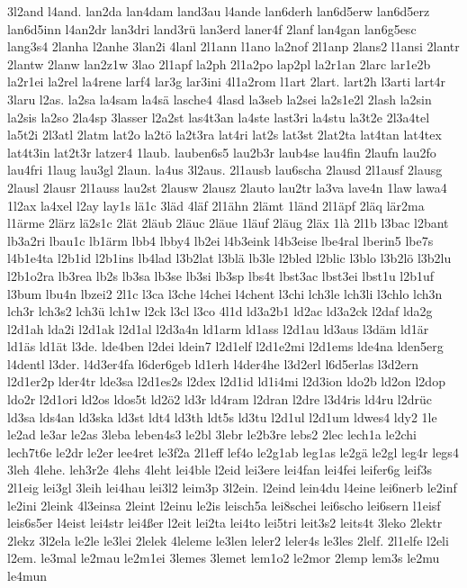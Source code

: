 {3l2and
l4and.
lan2da
lan4dam
land3au
l4ande
lan6derh
lan6d5erw
lan6d5erz
lan6d5inn
l4an2dr
lan3dri
land3rü
lan3erd
laner4f
2lanf
lan4gan
lan6g5esc
lang3s4
2lanha
l2anhe
3lan2i
4lanl
2l1ann
l1ano
la2nof
2l1anp
2lans2
l1ansi
2lantr
2lantw
2lanw
lan2z1w
3lao
2l1apf
la2ph
2l1a2po
lap2pl
la2r1an
2larc
lar1e2b
la2r1ei
la2rel
la4rene
larf4
lar3g
lar3ini
4l1a2rom
l1art
2lart.
lart2h
l3arti
lart4r
3laru
l2as.
la2sa
la4sam
la4sä
lasche4
4lasd
la3seb
la2sei
la2s1e2l
2lash
la2sin
la2sis
la2so
2la4sp
3lasser
l2a2st
las4t3an
la4ste
last3ri
la4stu
la3t2e
2l3a4tel
la5t2i
2l3atl
2latm
lat2o
la2tö
la2t3ra
lat4ri
lat2s
lat3st
2lat2ta
lat4tan
lat4tex
lat4t3in
lat2t3r
latzer4
1laub.
lauben6s5
lau2b3r
laub4se
lau4fin
2laufn
lau2fo
lau4fri
1laug
lau3gl
2laun.
la4us
3l2aus.
2l1ausb
lau6scha
2lausd
2l1ausf
2lausg
2lausl
2lausr
2l1auss
lau2st
2lausw
2lausz
2lauto
lau2tr
la3va
lave4n
1law
lawa4
1l2ax
la4xel
l2ay
lay1s
lä1c
3läd
4läf
2l1ähn
2lämt
1länd
2l1äpf
2läq
lär2ma
l1ärme
2lärz
lä2s1c
2lät
2läub
2läuc
2läue
1läuf
2läug
2läx
1là
2l1b
l3bac
l2bant
lb3a2ri
lbau1c
lb1ärm
lbb4
lbby4
lb2ei
l4b3eink
l4b3eise
lbe4ral
lberin5
lbe7s
l4b1e4ta
l2b1id
l2b1ins
lb4lad
l3b2lat
l3blä
lb3le
l2bled
l2blic
l3blo
l3b2lö
l3b2lu
l2b1o2ra
lb3rea
lb2s
lb3sa
lb3se
lb3si
lb3sp
lbs4t
lbst3ac
lbst3ei
lbst1u
l2b1uf
l3bum
lbu4n
lbzei2
2l1c
l3ca
l3che
l4chei
l4chent
l3chi
lch3le
lch3li
l3chlo
lch3n
lch3r
lch3s2
lch3ü
lch1w
l2ck
l3cl
l3co
4l1d
ld3a2b1
ld2ac
ld3a2ck
l2daf
lda2g
l2d1ah
lda2i
l2d1ak
l2d1al
l2d3a4n
ld1arm
ld1ass
l2d1au
ld3aus
l3däm
ld1är
ld1äs
ld1ät
l3de.
lde4ben
l2dei
ldein7
l2d1elf
l2d1e2mi
l2d1ems
lde4na
lden5erg
l4dentl
l3der.
l4d3er4fa
l6der6geb
ld1erh
l4der4he
l3d2erl
l6d5erlas
l3d2ern
l2d1er2p
lder4tr
lde3sa
l2d1es2s
l2dex
l2d1id
ld1i4mi
l2d3ion
ldo2b
ld2on
l2dop
ldo2r
l2d1ori
ld2os
ldos5t
ld2ö2
ld3r
ld4ram
l2dran
l2dre
l3d4ris
ld4ru
l2drüc
ld3sa
lds4an
ld3ska
ld3st
ldt4
ld3th
ldt5s
ld3tu
l2d1ul
l2d1um
ldwes4
ldy2
1le
le2ad
le3ar
le2as
3leba
leben4s3
le2bl
3lebr
le2b3re
lebs2
2lec
lech1a
le2chi
lech7t6e
le2dr
le2er
lee4ret
le3f2a
2l1eff
lef4o
le2g1ab
leg1as
le2gä
le2gl
leg4r
legs4
3leh
4lehe.
leh3r2e
4lehs
4leht
lei4ble
l2eid
lei3ere
lei4fan
lei4fei
leifer6g
leif3s
2l1eig
lei3gl
3leih
lei4hau
lei3l2
leim3p
3l2ein.
l2eind
lein4du
l4eine
lei6nerb
le2inf
le2ini
2leink
4l3einsa
2leint
l2einu
le2is
leisch5a
lei8schei
lei6scho
lei6sern
l1eisf
leis6s5er
l4eist
lei4str
lei4ßer
l2eit
lei2ta
lei4to
lei5tri
leit3s2
leits4t
3leko
2lektr
2lekz
3l2ela
le2le
le3lei
2lelek
4leleme
le3len
leler2
leler4s
le3les
2lelf.
2l1elfe
l2eli
l2em.
le3mal
le2mau
le2m1ei
3lemes
3lemet
lem1o2
le2mor
2lemp
lem3s
le2mu
le4mun
}
